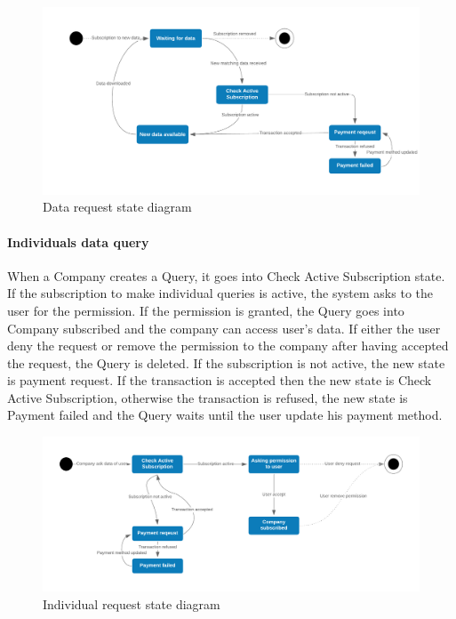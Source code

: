 \begin{figure}[H]
	\includegraphics[width=\textwidth,height=\textheight,keepaspectratio]{assets/Data_request.pdf}
	\caption{Data request state diagram}
	\label{fig:DataRequest}
\end{figure}




\paragraph{Individuals data query}
When a Company creates a Query, it goes into Check Active Subscription state. If the subscription to make individual queries is active, the system asks to the user for the permission. If the permission is granted, the Query goes into Company subscribed and the company can access user's data. If either the user deny the request or remove the permission to the company after having accepted the request, the Query is deleted.
If the subscription is not active, the new state is payment request. If the transaction is accepted then the new state is Check Active Subscription, otherwise the transaction is refused, the new state is Payment failed and the Query waits until the user update his payment method.

\begin{figure}[H]
	\includegraphics[width=\textwidth,height=\textheight,keepaspectratio]{assets/IndividualRequest.pdf}
	\caption{Individual request state diagram}
	\label{fig:IndividualRequest}
\end{figure}

